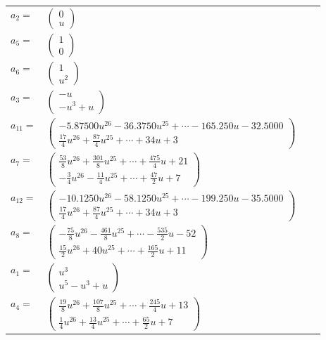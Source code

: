 \documentclass[1p]{elsarticle_modified}
\theoremstyle{definition}
\begin{document}
\begin{tabular}{m{7pt} m{180pt} m{7pt} m{180pt} }
\flushright $a_{2}=$&$\begin{pmatrix}0\\u\end{pmatrix}$ \\
\flushright $a_{5}=$&$\begin{pmatrix}1\\0\end{pmatrix}$ \\
\flushright $a_{6}=$&$\begin{pmatrix}1\\u^2\end{pmatrix}$ \\
\flushright $a_{3}=$&$\begin{pmatrix}- u\\- u^3+u\end{pmatrix}$ \\
\flushright $a_{11}=$&$\begin{pmatrix}-5.87500 u^{26}-36.3750 u^{25}+\cdots-165.250 u-32.5000\\\frac{17}{4} u^{26}+\frac{87}{4} u^{25}+\cdots+34 u+3\end{pmatrix}$ \\
\flushright $a_{7}=$&$\begin{pmatrix}\frac{53}{8} u^{26}+\frac{301}{8} u^{25}+\cdots+\frac{475}{4} u+21\\-\frac{3}{4} u^{26}-\frac{11}{4} u^{25}+\cdots+\frac{47}{2} u+7\end{pmatrix}$ \\
\flushright $a_{12}=$&$\begin{pmatrix}-10.1250 u^{26}-58.1250 u^{25}+\cdots-199.250 u-35.5000\\\frac{17}{4} u^{26}+\frac{87}{4} u^{25}+\cdots+34 u+3\end{pmatrix}$ \\
\flushright $a_{8}=$&$\begin{pmatrix}-\frac{75}{8} u^{26}-\frac{461}{8} u^{25}+\cdots-\frac{535}{2} u-52\\\frac{15}{2} u^{26}+40 u^{25}+\cdots+\frac{165}{2} u+11\end{pmatrix}$ \\
\flushright $a_{1}=$&$\begin{pmatrix}u^3\\u^5- u^3+u\end{pmatrix}$ \\
\flushright $a_{4}=$&$\begin{pmatrix}\frac{19}{8} u^{26}+\frac{107}{8} u^{25}+\cdots+\frac{245}{4} u+13\\\frac{1}{4} u^{26}+\frac{13}{4} u^{25}+\cdots+\frac{65}{2} u+7\end{pmatrix}$ \\

\end{tabular}
\end{document}
